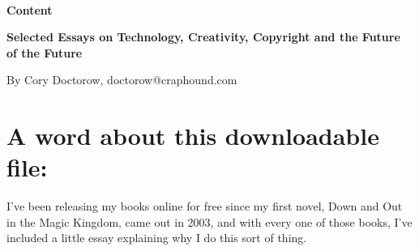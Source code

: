 \newcommand{\linkbreak}[1]{\hskip 0pt plus 1fil
  \discretionary{}{}{}
  {#1} \hskip 0pt plus 1fill
  \vrule width 0pt}
\renewcommand{\chapter}[1]{}
\renewcommand{\contentsname}{}

\newenvironment{parlist}{
  \setlength{\parindent}{0pt}
  \setlength{\parskip}{0.5\baselineskip plus 0.2\baselineskip} 
}{}

\newenvironment{ibox}[1]{
  \setlength{\parindent}{0pt}
  \par
  #1
  \par
  \addtolength{\leftskip}{\baselineskip}
}{\par}


\raggedbottom




\begin{center}
\thispagestyle{empty}
~
\bigskip

{\Huge \textsf{\textbf{Content}}}

\bigskip

\textbf{\Large Selected Essays on Technology, Creativity, Copyright
  and the Future of the Future}

\bigskip\bigskip

{\Large By Cory Doctorow, doctorow@craphound.com}
\end{center}

\bigskip\bigskip

\tableofcontents

\section{A word about this downloadable file:}

I've been releasing my books online for free since my first novel,
Down and Out in the Magic Kingdom, came out in 2003, and with every
one of those books, I've included a little essay explaining why I
do this sort of thing.


